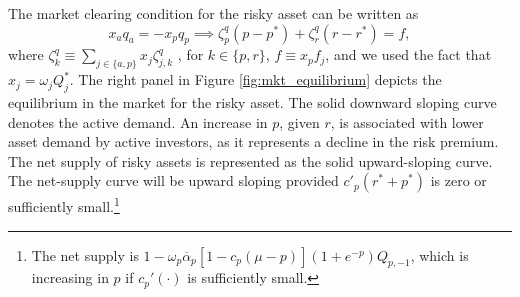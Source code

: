The market clearing condition for the risky asset can be written as 
\begin{equation}
    x_a q_a = - x_p q_p \implies \zeta_p^q (p-p^*) + \zeta_r^q (r-r^*) = f,\nonumber
\end{equation}
where $\zeta_k^q \equiv \sum_{j\in\{a,p\}} x_j \zeta_{j,k}^q$ , for $k \in \{p, r\}$, $f \equiv x_p f_j$, and we used the fact that $x_j = \omega_j Q_j^*$. 
The right panel in Figure \ref{fig:mkt_equilibrium} depicts the equilibrium in the market for the risky asset. 
The solid downward sloping curve denotes the active demand. An increase in $p$, given $r$, is associated with lower asset demand by active investors, as it represents a decline in the risk premium.  
The net supply of risky assets is represented as the solid upward-sloping curve.
The net-supply curve will be upward sloping provided $c'_p(r^*+p^*)$ is zero or sufficiently small.\footnote{The net supply is $1 - \omega_p \overline{\alpha}_p[1-c_p(\mu-p)] (1+e^{-p}) Q_{p,-1}$, which is increasing in $p$ if $c_p'(\cdot)$ is sufficiently small.} 

